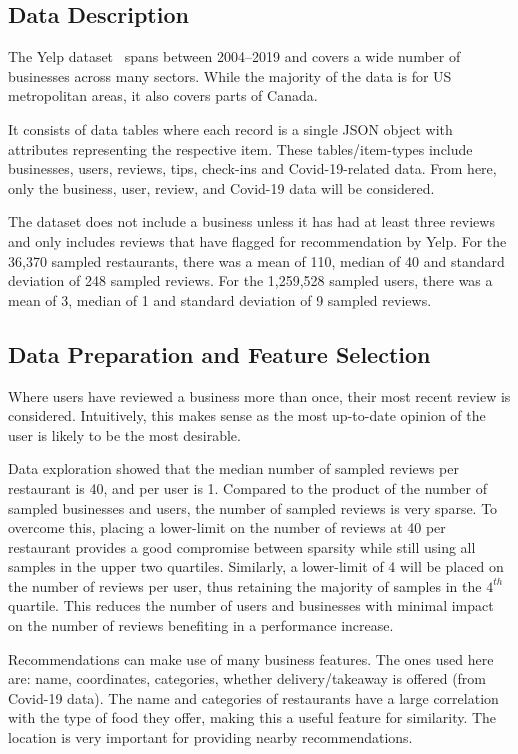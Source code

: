 \subsection{Data Description}\label{subsec:data-description}
The Yelp dataset~\cite{yelp2020} spans between 2004--2019 and covers a wide number of businesses across many sectors.
While the majority of the data is for US metropolitan areas, it also covers parts of Canada.

It consists of data tables where each record is a single JSON object with attributes representing the respective item.
These tables/item-types include businesses, users, reviews, tips, check-ins and Covid-19-related data.
From here, only the business, user, review, and Covid-19 data will be considered.

The dataset does not include a business unless it has had at least three reviews and only includes reviews that have flagged for recommendation by Yelp.
For the 36,370 sampled restaurants, there was a mean of 110, median of 40 and standard deviation of 248 sampled reviews.
For the 1,259,528 sampled users, there was a mean of 3, median of 1 and standard deviation of 9 sampled reviews.

\subsection{Data Preparation and Feature Selection}\label{subsec:data-preparation}
Where users have reviewed a business more than once, their most recent review is considered.
Intuitively, this makes sense as the most up-to-date opinion of the user is likely to be the most desirable.

Data exploration showed that the median number of sampled reviews per restaurant is 40, and per user is 1.
Compared to the product of the number of sampled businesses and users, the number of sampled reviews is very sparse.
To overcome this, placing a lower-limit on the number of reviews at 40 per restaurant provides a good compromise between sparsity while still using all samples in the upper two quartiles.
Similarly, a lower-limit of 4 will be placed on the number of reviews per user, thus retaining the majority of samples in the $4^{th}$ quartile.
This reduces the number of users and businesses with minimal impact on the number of reviews benefiting in a performance increase.

Recommendations can make use of many business features.
The ones used here are: name, coordinates, categories, whether delivery/takeaway is offered (from Covid-19 data).
The name and categories of restaurants have a large correlation with the type of food they offer, making this a useful feature for similarity.
The location is very important for providing nearby recommendations.

